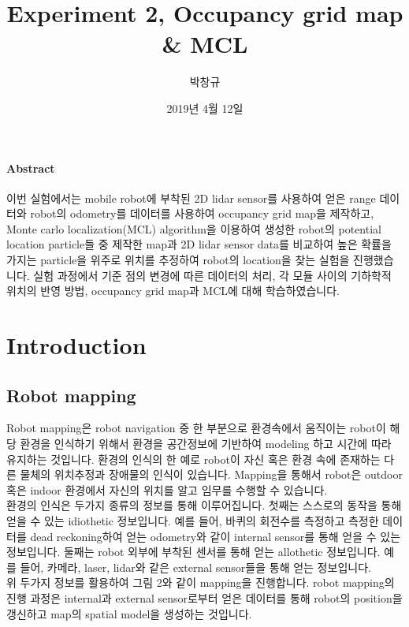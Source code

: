 \documentclass{article}
\title{Experiment 2, Occupancy grid map \& MCL}
\author{박창규}
\date{2019년 4월 12일}
\begin{document}
	\maketitle
	\thispagestyle{empty}
	\newpage
	\paragraph{Abstract}
	이번 실험에서는 mobile robot에 부착된 2D lidar sensor를 사용하여 얻은 range 데이터와 robot의 odometry를 데이터를 사용하여 occupancy grid map을 제작하고, Monte carlo localization(MCL) algorithm을 이용하여 생성한 robot의 potential location particle들 중 제작한 map과 2D lidar sensor data를 비교하여 높은 확률을 가지는 particle을 위주로 위치를 추정하여 robot의 location을 찾는 실험을 진행했습니다. 실험 과정에서 기준 점의 변경에 따른 데이터의 처리, 각 모듈 사이의 기하학적 위치의 반영 방법, occupancy grid map과 MCL에 대해 학습하였습니다.
	\tableofcontents
	\thispagestyle{empty}
	
	\newpage
	\setcounter{page}{1}
		
	\section{Introduction}
		\subsection{Robot mapping}
		Robot mapping은 robot navigation 중 한 부분으로 환경속에서 움직이는 robot이 해당 환경을 인식하기 위해서 환경을 공간정보에 기반하여 modeling 하고 시간에 따라 유지하는 것입니다. 환경의 인식의 한 예로 robot이 자신 혹은 환경 속에 존재하는 다른 물체의 위치추정과 장애물의 인식이 있습니다. Mapping을 통해서 robot은 outdoor 혹은 indoor 환경에서 자신의 위치를 알고 임무를 수행할 수 있습니다.\\
		\indent 환경의 인식은 두가지 종류의 정보를 통해 이루어집니다. 첫째는 스스로의 동작을 통해 얻을 수 있는 idiothetic 정보입니다. 예를 들어, 바퀴의 회전수를 측정하고 측정한 데이터를 dead reckoning하여 얻는 odometry와 같이 internal sensor를 통해 얻을 수 있는 정보입니다. 둘째는 robot 외부에 부착된 센서를 통해 얻는 allothetic 정보입니다. 예를 들어, 카메라, laser, lidar와 같은 external sensor들을 통해 얻는 정보입니다.\\
		\indent 위 두가지 정보를 활용하여 그림 2와 같이 mapping을 진행합니다. robot mapping의 진행 과정은 internal과 external sensor로부터 얻은 데이터를 통해 robot의 position을 갱신하고 map의 spatial model을 생성하는 것입니다.
\end{document}
